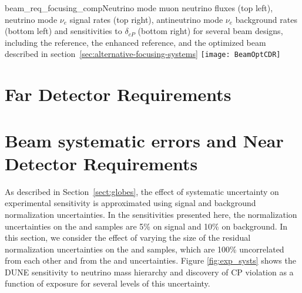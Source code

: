 \begin{cdrfigure}
{beam_req_focusing_comp}{Neutrino mode muon
    neutrino fluxes (top left), neutrino mode $\nu_e$ signal rates
    (top right), antineutrino mode $\nu_e$ background rates (bottom left) and
    sensitivities to $\delta_{cP}$ (bottom right) for several beam designs, including the
    reference, the enhanced reference, and the optimized beam described in section~\ref{sec:alternative-focusing-systems}}
  \texttt{[image: BeamOptCDR]}
\end{cdrfigure}

\section{Far Detector Requirements}
\label{sec:physics-lbnosc-fd-req}

\section{Beam systematic errors and Near Detector Requirements}
\label{sec:physics-lbnosc-beamnd-req}

As described in Section~\ref{sect:globes}, the effect of systematic uncertainty on
experimental sensitivity is approximated using signal and background
normalization uncertainties. In the sensitivities presented here, the
normalization uncertainties on the \numu and \anumu samples are 5\%
on signal and 10\% on background. In this section, we consider the effect of
varying the size of the residual normalization uncertainties
on the \nue and \anue samples, which are 100\% uncorrelated from each other and from the
\numu and \anumu uncertainties.
Figure \ref{fig:exp_systs} shows the
DUNE sensitivity to neutrino mass hierarchy and discovery of CP violation
as a function of exposure for several levels of this uncertainty.

